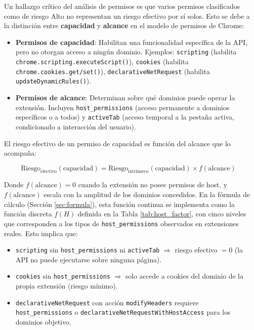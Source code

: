 \documentclass[12pt,oneside]{report}
\begin{document}
Un hallazgo crítico del análisis de permisos es que varios permisos clasificados como de riesgo Alto no representan un riesgo efectivo por sí solos. Esto se debe a la distinción entre \textbf{capacidad} y \textbf{alcance} en el modelo de permisos de Chrome:

\begin{itemize}
    \item \textbf{Permisos de capacidad}: Habilitan una funcionalidad específica de la API, pero no otorgan acceso a ningún dominio. Ejemplos: \texttt{scripting} (habilita \texttt{chrome.scripting.\allowbreak executeScript()}), \texttt{cookies} (habilita \texttt{chrome.cookies.\allowbreak get/set()}), \texttt{declarativeNetRequest} (habilita \texttt{update\-Dynamic\-Rules()}).
    \item \textbf{Permisos de alcance}: Determinan sobre qué dominios puede operar la extensión. Incluyen \texttt{host\_permissions} (acceso permanente a dominios específicos o a todos) y \texttt{activeTab} (acceso temporal a la pestaña activa, condicionado a interacción del usuario).
\end{itemize}

El riesgo efectivo de un permiso de capacidad es función del alcance que lo acompaña:

\begin{equation}
\text{Riesgo}_{\text{efectivo}}(\text{capacidad}) = \text{Riesgo}_{\text{intrínseco}}(\text{capacidad}) \times f(\text{alcance})
\label{eq:riesgo_efectivo}
\end{equation}

Donde $f(\text{alcance}) = 0$ cuando la extensión no posee permisos de host, y $f(\text{alcance})$ escala con la amplitud de los dominios concedidos. En la fórmula de cálculo (Sección \ref{sec:formula}), esta función continua se implementa como la función discreta $f(H)$ definida en la Tabla \ref{tab:host_factor}, con cinco niveles que corresponden a los tipos de \texttt{host\_permissions} observados en extensiones reales. Esto implica que:

\begin{itemize}
    \item \texttt{scripting} sin \texttt{host\_permissions} ni \texttt{activeTab} $\Rightarrow$ riesgo efectivo $= 0$ (la API no puede ejecutarse sobre ninguna página).
    \item \texttt{cookies} sin \texttt{host\_permissions} $\Rightarrow$ solo accede a cookies del dominio de la propia extensión (riesgo mínimo).
    \item \texttt{declarativeNetRequest} con acción \texttt{modifyHeaders} requiere \texttt{host\_permissions} o \texttt{declarativeNetRequestWithHostAccess} para los dominios objetivo.
\end{itemize}
\end{document}

